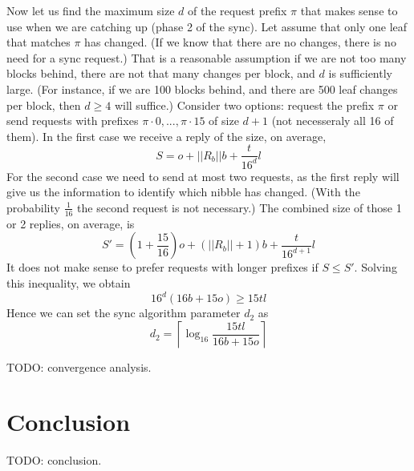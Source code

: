 \documentclass{amsart}
\begin{document}
Now let us find the maximum size $d$ of the request prefix $\pi$ that makes sense to use when we are catching up (phase 2 of the sync).
Let assume that only one leaf that matches $\pi$ has changed.
(If we know that there are no changes, there is no need for a sync request.)
That is a reasonable assumption if we are not too many blocks behind, there are not that many changes per block, and $d$ is sufficiently large.
(For instance, if we are 100 blocks behind, and there are 500 leaf changes per block, then $d \geq 4$ will suffice.)
Consider two options: request the prefix $\pi$ or send requests with prefixes $\pi \cdot 0, ..., \pi \cdot 15$ of size $d+1$
(not necesseraly all 16 of them).
In the first case we receive a reply of the size, on average,
\begin{equation}
    S = o + ||R_b|| b + \frac{t}{16^d} l
\end{equation}
For the second case we need to send at most two requests,
as the first reply will give us the information to identify which nibble has changed.
(With the probability $\frac{1}{16}$ the second request is not necessary.)
The combined size of those 1 or 2 replies, on average, is
\begin{equation}
    S' = \left( 1 + \frac{15}{16} \right) o + (||R_b|| + 1) b + \frac{t}{16^{d+1}} l
\end{equation}
It does not make sense to prefer requests with longer prefixes if $S \leq S'$.
Solving this inequality, we obtain
\begin{equation}
    16^d (16b + 15o) \geq 15tl
\end{equation}
Hence we can set the sync algorithm parameter $d_2$ as
\begin{equation}
d_2 = \left\lceil \log_{16} \frac{15tl} {16b + 15o} \right\rceil
\end{equation}

TODO: convergence analysis.

\section{Conclusion}

TODO: conclusion.




\end{document}
